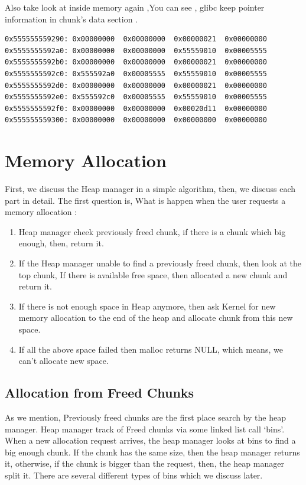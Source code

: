 \documentclass{masterthesis}
\newcommand*\libc{glibc}
\begin{document}
Also take look at inside memory again ,You can see , \libc{} keep pointer information in chunk's data section .
\begin{lstlisting}[frame=tlrb]
0x555555559290:	0x00000000	0x00000000	0x00000021	0x00000000
0x5555555592a0:	0x00000000	0x00000000	0x55559010	0x00005555
0x5555555592b0:	0x00000000	0x00000000	0x00000021	0x00000000
0x5555555592c0:	0x555592a0	0x00005555	0x55559010	0x00005555
0x5555555592d0:	0x00000000	0x00000000	0x00000021	0x00000000
0x5555555592e0:	0x555592c0	0x00005555	0x55559010	0x00005555
0x5555555592f0:	0x00000000	0x00000000	0x00020d11	0x00000000
0x555555559300:	0x00000000	0x00000000	0x00000000	0x00000000
\end{lstlisting}
 
\section{Memory Allocation}
 First, we discuss the Heap manager in a simple algorithm, then, we discuss each part in detail. The first question is, What is happen when the user requests a memory allocation : 
\begin{enumerate}
	\item Heap manager cheek previously freed chunk, if there is a chunk which big enough, then, return it.
	\item If the Heap manager unable to find a previously freed chunk, then look at the top chunk, If there is available free space, then allocated a new chunk and return it.
	\item If there is not enough space in Heap anymore, then ask Kernel for new memory allocation to the end of the heap and allocate chunk from this new space.
	\item If all the above space failed then malloc returns NULL, which means, we can’t allocate new space.
\end{enumerate}

\subsection{Allocation from Freed Chunks}
As we mention, Previously freed chunks are the first place search by the heap manager. Heap manager track of Freed chunks via some linked list call ‘bins’. When a new allocation request arrives, the heap manager looks at bins to find a big enough chunk. If the chunk has the same size, then the heap manager returns it, otherwise, if the chunk is bigger than the request, then, the heap manager split it. There are several different types of bins which we discuss later.
\end{document}

